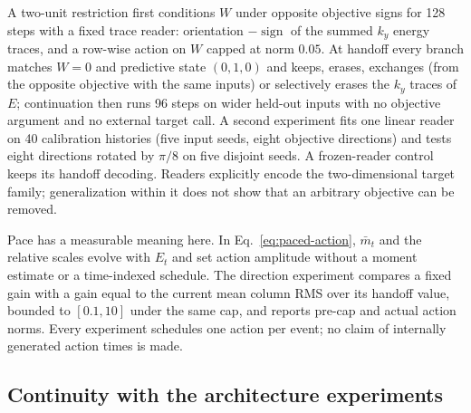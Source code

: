 \documentclass[11pt]{article}
\theoremstyle{definition}
\begin{document}
A two-unit restriction first conditions $W$ under opposite objective signs for 128
steps with a fixed trace reader: orientation $-\operatorname{sign}$ of the summed
$k_y$ energy traces, and a row-wise action on $W$ capped at norm $0.05$. At handoff
every branch matches $W=0$ and predictive state $(0,1,0)$ and keeps, erases,
exchanges (from the opposite objective with the same inputs) or selectively erases
the $k_y$ traces of $E$; continuation then runs 96 steps on wider held-out inputs
with no objective argument and no external target call. A second experiment fits
one linear reader on 40 calibration histories (five input seeds, eight objective
directions) and tests eight directions rotated by $\pi/8$ on five disjoint seeds.
A frozen-reader control keeps its handoff decoding. Readers explicitly encode the
two-dimensional target family; generalization within it does not show that an
arbitrary objective can be removed.

Pace has a measurable meaning here. In Eq.~\eqref{eq:paced-action}, $\bar m_t$
and the relative scales evolve with $E_t$ and set action amplitude without a moment
estimate or a time-indexed schedule. The direction experiment compares a fixed gain
with a gain equal to the current mean column RMS over its handoff value, bounded to
$[0.1,10]$ under the same cap, and reports pre-cap and actual action norms. Every
experiment schedules one action per event; no claim of internally generated action
times is made.

\subsection{Continuity with the architecture experiments}
\end{document}
